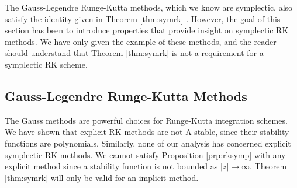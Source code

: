 


The Gauss-Legendre Runge-Kutta methods, which we know are symplectic,
also satisfy the identity given in Theorem \ref{thm:symrk} \cite{gni2006}.
However, the goal of this section has been to introduce properties that provide insight on symplectic RK methods.
We have only given the example of these methods, and the reader should understand that Theorem \ref{thm:symrk} is not a requirement for a symplectic RK scheme.

\subsection{Gauss-Legendre Runge-Kutta Methods}

The Gauss methods are powerful choices for Runge-Kutta integration schemes.
We have shown that explicit RK methods are not A-stable, since their stability functions are polynomials.
Similarly, none of our analysis has concerned explicit symplectic RK methods.
We cannot satisfy Proposition \ref{prp:rksymp} with any explicit method since a stability function is not bounded as $|z| \rightarrow \infty$.
Theorem \ref{thm:symrk} will only be valid for an implicit method.


